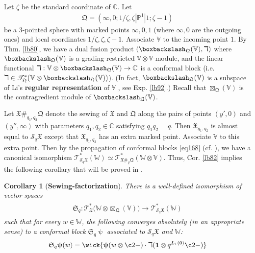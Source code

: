 \documentclass[11pt,b5paper,notitlepage]{article}
\theoremstyle{definition}
\theoremstyle{plain}
\newtheorem{co}[df]{Corollary}
\newcommand{\fk}{\mathfrak}
\newcommand{\mc}{\mathcal}
\newcommand{\idt}{\mathbf{1}}
\newcommand{\scr}{\mathscr}
\newcommand{\Vbb}{\mathbb V}
\newcommand{\Wbb}{\mathbb W}
\newcommand{\Cbb}{\mathbb C}
\newcommand{\Pbb}{\mathbb P}
\newcommand{\<}{\left\langle}
\renewcommand{\>}{\right\rangle}
\newcommand{\fx}{\mathfrak{X}}
\newcommand{\bbs}{\boxbackslash}
\newcommand{\fq}{{\mathfrak Q}}
\numberwithin{equation}{section}
\begin{document}
Let $\zeta$ be the standard coordinate of $\Cbb$. Let
\begin{align}
\fq=(\infty,0;1/\zeta,\zeta|\Pbb^1|1;\zeta-1)   \label{eq171}
\end{align}
be a $3$-pointed sphere with marked points $\infty,0,1$ (where $\infty,0$ are the outgoing ones) and local coordinates $1/\zeta,\zeta,\zeta-1$. Associate $\Vbb$ to the incoming point $1$. By Thm. \ref{lb80}, we have a dual fusion product $(\bbs_\fq(\Vbb),\daleth)$ where $\bbs_\fq(\Vbb)$ is a grading-restricted $\Vbb\otimes\Vbb$-module, and the linear functional $\daleth:\Vbb\otimes \bbs_\fq(\Vbb)\rightarrow\Cbb$ is a conformal block (i.e. $\daleth\in\scr T_\fq^*(\Vbb\otimes\bbs_\fq(\Vbb))$). (In fact, $\bbs_\fq(\Vbb)$ is a subspace of Li's \textbf{regular representation} of $\Vbb$ \cite{Li-regular-rep,LS-twisted-regular-rep}, see Exp. \ref{lb92}.) Recall that $\boxtimes_\fq(\Vbb)$ is the contragredient module of $\bbs_\fq(\Vbb)$. 

Let $\fx\#_{q_1,q_2}\fq$ denote the sewing of $\fx$ and $\fq$ along the pairs of points $(y',0)$ and $(y'',\infty)$ with parameters $q_1,q_2\in\Cbb$ satisfying $q_1q_2=q$. Then $\fx_{q_1,q_2}$ is almost equal to $\mc S_q\fx$ except that $\fx_{q_1,q_2}$ has an extra marked point. Associate $\Vbb$ to this extra point. Then by the propagation of conformal blocks \eqref{eq168} (cf. \cite{Zhu-global,FB04,Cod19,DGT1,Gui-propagation}), we have a canonical isomorphism $\scr T_{\mc S_q\fx}^*(\Wbb)\simeq\scr T_{\fx\#_q\fq}^*(\Wbb\otimes\Vbb)$. Thus, Cor. \ref{lb82} implies the following corollary that will be proved in \cite[Thm. 2.2]{GZ3}.

\begin{co}[\textbf{Sewing-factorization}]\label{lb85}
There is a well-defined isomorphism of vector spaces
\begin{gather}
\begin{gathered}
\fk S_q:\scr T_\fx^*\big(\Wbb\otimes\boxtimes_\fq(\Vbb)\big)\rightarrow\scr T_{\mc S_q\fx}^*(\Wbb)
\end{gathered}
\end{gather}
such that for every $w\in\Wbb$, the following converges absolutely (in an appropriate sense) to a conformal block $\fk S_q\uppsi$ associated to $\mc S_q\fx$ and $\Wbb$:
\begin{align}
\fk S_q\uppsi(w)=\wick{\uppsi(w\otimes \c2 -)\cdot \daleth(\idt\otimes q^{L_1(0)} \c2-)}\label{eq169}
\end{align}
\end{co}
\end{document}
